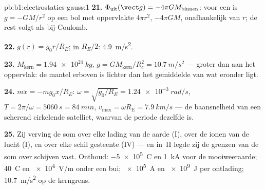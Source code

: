 \begin{solution}{pb:b1:electrostatics-gauss:1}
\textbf{21.} $\Phi_{\text{uit}}(\vect g) = -4\pi GM_{\text{binnen}}$: voor een 
is $g = -GM/r^2$ op een bol met oppervlakte $4\pi r^2$,  $-4\pi GM$, onafhankelijk
van $r$; de rest volgt als bij Coulomb.

\textbf{22.} $g(r) = g_0r/R_E$; in $R_E/2$: \qty{4.9}{m/s^2}.

\textbf{23.} $M_{\text{kern}} = \qty{1.94e24}{kg}$, $g = GM_{\text{kern}}/R_c^2 =
\qty{10.7}{m/s^2}$ --- groter dan aan het oppervlak: de mantel erboven is
lichter dan het gemiddelde van wat eronder ligt.

\textbf{24.} $m\ddot x = -mg_0x/R_E$: $\omega = \sqrt{g_0/R_E} = \qty{1.24e-3}{rad/s}$,
$T = 2\pi/\omega = \qty{5060}{s} = \qty{84}{min}$, $v_{\max} = \omega R_E =
\qty{7.9}{km/s}$ --- de baansnelheid van een scherend cirkelende satelliet, waarvan de
periode dezelfde is.

\textbf{25.} Zij verving de som over elke lading van de aarde (I),
over de ionen van de lucht (I), en over elke schil gesteente (IV) --- en
in~II legde zij de grenzen van de som over schijven vast. Onthoud: \qty{-5e5}{C} en
\qty{1}{kA} voor de mooiweeraarde; \qty{40}{C} en \qty{e4}{V/m} onder een
bui; \qty{e5}{A} en \qty{e9}{J} per ontlading; \qty{10.7}{m/s^2} op de
kerngrens.
\end{solution}
